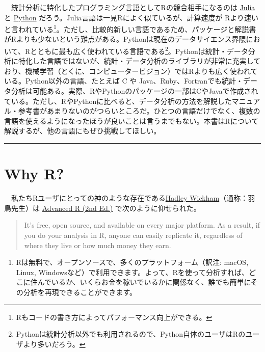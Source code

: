 \documentclass[
  a4paper,
  pandoc,
  ja=standard,
  jafont=haranoaji]{bxjsbook}
\providecommand{\tightlist}{%
  \setlength{\itemsep}{0pt}\setlength{\parskip}{0pt}}
\begin{document}
　統計分析に特化したプログラミング言語としてRの競合相手になるのは
\href{https://julialang.org}{Julia} と
\href{https://www.python.org}{Python}
だろう。Julia言語は一見Rによく似ているが、計算速度が
Rより速いと言われている\footnote{Rもコードの書き方によってパフォーマンス向上ができる。}。ただし、比較的新しい言語であるため、パッケージと解説書がRよりも少ないという難点がある。Pythonは現在のデータサイエンス界隈において、Rとともに最も広く使われている言語である\footnote{Pythonは統計分析以外でも利用されるので、Python自体のユーザはRのユーザより多いだろう。}。Pythonは統計・データ分析に特化した言語ではないが、統計・データ分析のライブラリが非常に充実しており、機械学習（とくに、コンピュータービジョン）ではRよりも広く使われている。Python以外の言語、たとえば
C や
Java、Ruby、Fortranでも統計・データ分析は可能ある。実際、RやPythonのパッケージの一部はCやJavaで作成されている。ただし、RやPythonに比べると、データ分析の方法を解説したマニュアル・参考書があまりないのがつらいところだ。ひとつの言語だけでなく、複数の言語を使えるようになったほうが良いことは言うまでもない。本書はRについて解説するが、他の言語にもぜひ挑戦してほしい。

\begin{center}\rule{0.5\linewidth}{0.5pt}\end{center}

\hypertarget{WhyR}{%
\section{Why R?}\label{WhyR}}

　私たちRユーザにとっての神のような存在である\href{http://hadley.nz}{Hadley
Wickham}（通称：羽鳥先生）は \href{https://adv-r.hadley.nz}{Advanced R
(2nd Ed.)} で次のように仰せられた。

\begin{quote}
It's free, open source, and available on every major platform. As a
result, if you do your analysis in R, anyone can easily replicate it,
regardless of where they live or how much money they earn.
\end{quote}

\begin{enumerate}
\def\labelenumi{\arabic{enumi}.}
\tightlist
\item
  Rは無料で、オープンソースで、多くのプラットフォーム（訳注: macOS,
  Linux,
  Windowsなど）で利用できます。よって、Rを使って分析すれば、どこに住んでいるか、いくらお金を稼いでいるかに関係なく、誰でも簡単にその分析を再現できることができます。
\end{enumerate}
\end{document}
